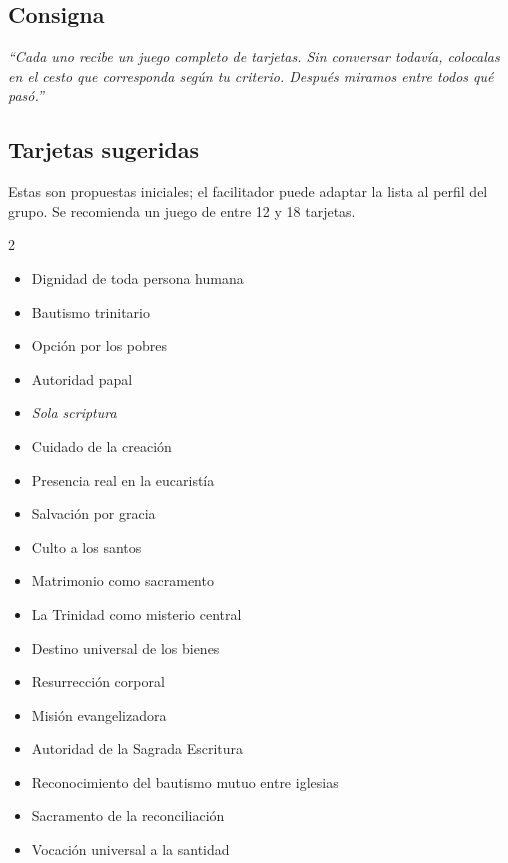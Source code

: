 \documentclass[11pt, a4paper]{article}
\begin{document}
\begin{actividad}
\subsection*{Consigna}
\emph{``Cada uno recibe un juego completo de tarjetas. Sin conversar todavía, colocalas en el cesto que corresponda según tu criterio. Después miramos entre todos qué pasó.''}

\subsection*{Tarjetas sugeridas}
Estas son propuestas iniciales; el facilitador puede adaptar la lista al perfil del grupo. Se recomienda un juego de entre 12 y 18 tarjetas.

\begin{multicols}{2}
\begin{itemize}[leftmargin=1.2em]
  \item Dignidad de toda persona humana
  \item Bautismo trinitario
  \item Opción por los pobres
  \item Autoridad papal
  \item \emph{Sola scriptura}
  \item Cuidado de la creación
  \item Presencia real en la eucaristía
  \item Salvación por gracia
  \item Culto a los santos
  \item Matrimonio como sacramento
  \item La Trinidad como misterio central
  \item Destino universal de los bienes
  \item Resurrección corporal
  \item Misión evangelizadora
  \item Autoridad de la Sagrada Escritura
  \item Reconocimiento del bautismo mutuo entre iglesias
  \item Sacramento de la reconciliación
  \item Vocación universal a la santidad
\end{itemize}
\end{multicols}


\end{actividad}
\end{document}
